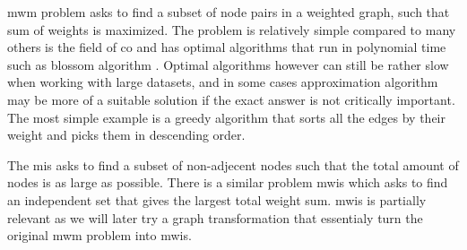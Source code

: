 \gls{mwm} problem asks to find a subset of node pairs in a weighted graph, such that sum of weights is maximized. The problem is relatively simple compared to many others is the field of \gls{co} and has optimal algorithms that run in polynomial time such as blossom algorithm \cite{blossom}. Optimal algorithms however can still be rather slow when working with large datasets, and in some cases approximation algorithm may be more of a suitable solution if the exact answer is not critically important. The most simple example is a greedy algorithm that sorts all the edges by their weight and picks them in descending order.

The \gls{mis} asks to find a subset of non-adjecent nodes such that the total amount of nodes is as large as possible. There is a similar problem \gls{mwis} which asks to find an independent set that gives the largest total weight sum. \gls{mwis} is partially relevant as we will later try a graph transformation that essentialy turn the original \gls{mwm} problem into \gls{mwis}.

